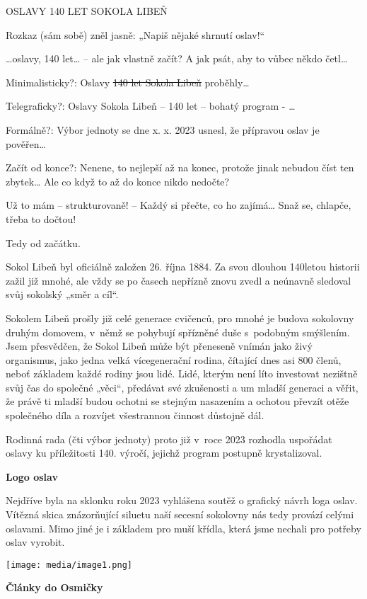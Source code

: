 OSLAVY 140 LET SOKOLA LIBEŇ

Rozkaz (sám sobě) zněl jasně: „Napiš nějaké shrnutí oslav!{}``

\ldots oslavy, 140 let\ldots{} -- ale jak vlastně začít? A jak psát, aby
to vůbec někdo četl\ldots{}

Minimalisticky?: Oslavy \st{140 let Sokola Libeň} proběhly\ldots{}

Telegraficky?: Oslavy Sokola Libeň -- 140 let -- bohatý program -
\ldots{}

Formálně?: Výbor jednoty se dne x. x. 2023 usnesl, že přípravou oslav je
pověřen\ldots{}

Začít od konce?: Nenene, to nejlepší až na konec, protože jinak nebudou
číst ten zbytek\ldots{} Ale co když to až do konce nikdo nedočte?

Už to mám -- strukturovaně! -- Každý si přečte, co ho zajímá\ldots{}
Snaž se, chlapče, třeba to dočtou!

Tedy od začátku.

Sokol Libeň byl oficiálně založen 26. října 1884. Za svou dlouhou
140letou historii zažil již mnohé, ale vždy se po časech nepřízně znovu
zvedl a neúnavně sledoval svůj sokolský „směr a cíl``.

Sokolem Libeň prošly již celé generace cvičenců, pro mnohé je budova
sokolovny druhým domovem, v~němž se pohybují spřízněné duše s~podobným
smýšlením. Jsem přesvědčen, že Sokol Libeň může být přeneseně vnímán
jako živý organismus, jako jedna velká vícegenerační rodina, čítající
dnes asi 800 členů, neboť základem každé rodiny jsou lidé. Lidé, kterým
není líto investovat nezištně svůj čas do společné „věci``, předávat své
zkušenosti a um mladší generaci a věřit, že právě ti mladší budou
ochotni se stejným nasazením a ochotou převzít otěže společného díla a
rozvíjet všestrannou činnost důstojně dál.

Rodinná rada (čti výbor jednoty) proto již v~roce 2023 rozhodla
uspořádat oslavy ku příležitosti 140. výročí, jejichž program postupně
krystalizoval.

\textbf{Logo oslav}

Nejdříve byla na sklonku roku 2023 vyhlášena soutěž o grafický návrh
loga oslav. Vítězná skica znázorňující siluetu naší secesní sokolovny
nás tedy provází celými oslavami. Mimo jiné je i základem pro muší
křídla, která jsme nechali pro potřeby oslav vyrobit.

\texttt{[image: media/image1.png]}

\textbf{Články do Osmičky}

